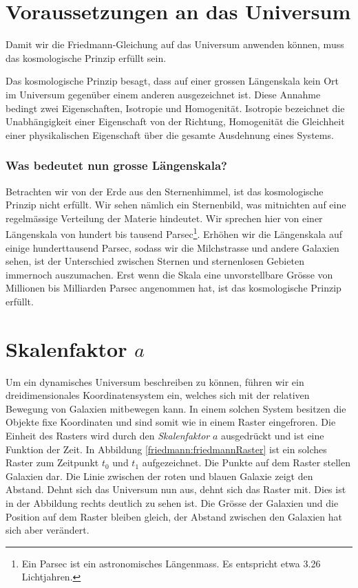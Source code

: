 \begin{refsection}
\section{Voraussetzungen an das Universum}
Damit wir die Friedmann-Gleichung auf das Universum anwenden können, muss das kosmologische Prinzip erfüllt sein. 
\begin{satz}
	\label{Prinzip:kosmologisches Prinzip}
	Das kosmologische Prinzip besagt, dass auf einer grossen Längenskala kein Ort im Universum gegenüber einem anderen ausgezeichnet ist. Diese Annahme bedingt zwei Eigenschaften, Isotropie und Homogenität. Isotropie  bezeichnet die Unabhängigkeit einer Eigenschaft von der Richtung, Homogenität die Gleichheit einer physikalischen Eigenschaft über die gesamte Ausdehnung eines Systems.
\end{satz}

\subsubsection*{Was bedeutet nun grosse Längenskala?}
Betrachten wir von der Erde aus den Sternenhimmel, ist das kosmologische Prinzip nicht erfüllt. Wir sehen nämlich ein Sternenbild, was mitnichten auf eine regelmässige Verteilung der Materie hindeutet. Wir sprechen hier von einer Längenskala von hundert bis tausend Parsec\footnote{Ein Parsec ist ein astronomisches Längenmass. Es entspricht etwa 3.26 Lichtjahren.}. Erhöhen wir die Längenskala auf einige hunderttausend Parsec, sodass wir die Milchstrasse und andere Galaxien sehen, ist der Unterschied zwischen Sternen und sternenlosen Gebieten immernoch auszumachen. Erst wenn die Skala eine unvorstellbare Grösse von Millionen bis Milliarden Parsec angenommen hat, ist das kosmologische Prinzip erfüllt. 

\section{Skalenfaktor $a$\label{Section:Skalenfaktor}}
Um ein dynamisches Universum beschreiben zu können, führen wir ein dreidimensionales Koordinatensystem ein, welches sich mit der relativen Bewegung von Galaxien mitbewegen kann. In einem solchen System besitzen die Objekte fixe Koordinaten und sind somit wie in einem Raster eingefroren. Die Einheit des Rasters wird durch den {\em Skalenfaktor} $a$ ausgedrückt und ist eine Funktion der Zeit. In Abbildung \ref{friedmann:friedmannRaster} ist ein solches Raster zum Zeitpunkt $t_0$ und $t_1$ aufgezeichnet. Die Punkte auf dem Raster stellen Galaxien dar. Die Linie zwischen der roten und blauen Galaxie zeigt den Abstand. Dehnt sich das Universum nun aus, dehnt sich das Raster mit. Dies ist in der Abbildung rechts deutlich zu sehen ist. Die Grösse der Galaxien und die Position auf dem Raster bleiben gleich, der Abstand zwischen den Galaxien hat sich aber verändert. 


\end{refsection}
